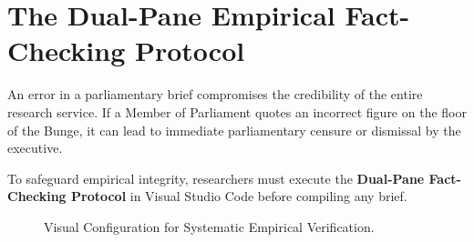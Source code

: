 \documentclass[11pt, a4paper]{report}
\begin{document}
\newpage

\section{The Dual-Pane Empirical Fact-Checking Protocol}
An error in a parliamentary brief compromises the credibility of the entire research service. If a Member of Parliament quotes an incorrect figure on the floor of the Bunge, it can lead to immediate parliamentary censure or dismissal by the executive.

To safeguard empirical integrity, researchers must execute the \textbf{Dual-Pane Fact-Checking Protocol} in Visual Studio Code before compiling any brief.

\begin{figure}[htbp]
  \centering
  \caption{Visual Configuration for Systematic Empirical Verification.}
  \label{fig:fact_checking_panes}
\end{figure}
\end{document}
